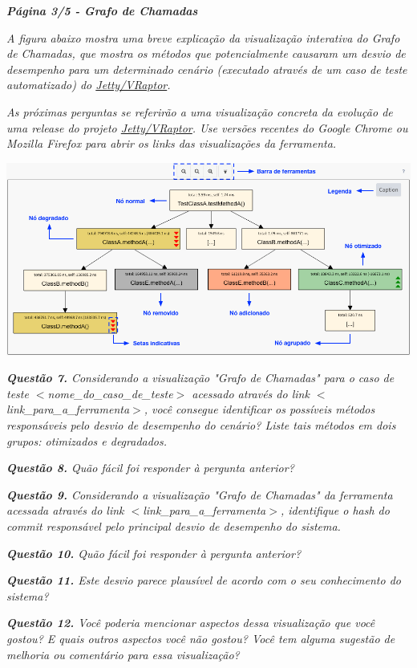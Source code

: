 \begin{framed}
	\noindent \textit{\textbf{Página 3/5 - Grafo de Chamadas}}
	\par
	\noindent \textit{A figura abaixo mostra uma breve explicação da visualização interativa do Grafo de Chamadas, que mostra os métodos que potencialmente causaram um desvio de desempenho para um determinado cenário (executado através de um caso de teste automatizado) do \underline{Jetty/VRaptor}.}

	\noindent \textit{As próximas perguntas se referirão a uma visualização concreta da evolução de uma release do projeto \underline{Jetty/VRaptor}. Use versões recentes do Google Chrome ou Mozilla Firefox para abrir os links das visualizações da ferramenta.}
	
   \includegraphics[scale=0.41]{Imagens/call_graph_explicative_portuguese.png}

	\noindent \textit{\textbf{Questão 7.} Considerando a visualização "Grafo de Chamadas" para o caso de teste {\(<\)}nome\_do\_caso\_de\_teste{\(>\)} acessado através do link {\(<\)}link\_para\_a\_ferramenta{\(>\)}, você consegue identificar os possíveis métodos responsáveis pelo desvio de desempenho do cenário? Liste tais métodos em dois grupos: otimizados e degradados.}
	\par
	\noindent \textit{\textbf{Questão 8.} Quão fácil foi responder à pergunta anterior?}
	\par
	\noindent \textit{\textbf{Questão 9.} Considerando a visualização "Grafo de Chamadas" da ferramenta acessada através do link {\(<\)}link\_para\_a\_ferramenta{\(>\)}, identifique o hash do commit responsável pelo principal desvio de desempenho do sistema.}
	\par
	\noindent \textit{\textbf{Questão 10.} Quão fácil foi responder à pergunta anterior?}
	\par
	\noindent \textit{\textbf{Questão 11.} Este desvio parece plausível de acordo com o seu conhecimento do sistema?}
	\par
	\noindent \textit{\textbf{Questão 12.} Você poderia mencionar aspectos dessa visualização que você gostou? E quais outros aspectos você não gostou? Você tem alguma sugestão de melhoria ou comentário para essa visualização?}
\end{framed}


